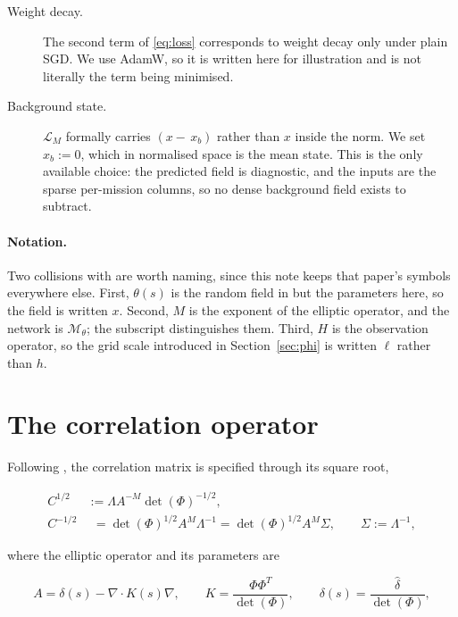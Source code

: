 \documentclass[11pt]{article}
\newcommand{\Mnet}{\mathcal{M}_\theta}
\newcommand{\grid}{\ell}
\newcommand{\dhat}{\hat{\delta}}
\begin{document}
\begin{description}
  \item[Weight decay.] The second term of \eqref{eq:loss} corresponds to weight decay
  only under plain SGD. We use AdamW, so it is written here for illustration and is not
  literally the term being minimised.

  \item[Background state.] $\mathcal{L}_M$ formally carries $(x-\,x_b)$ rather
      than $x$ inside the norm. We
  set $x_b := 0$, which in normalised space is the mean state. This is the only available
  choice: the predicted field is diagnostic, and the inputs are the sparse per-mission
  columns, so no dense background field exists to subtract.
\end{description}

\paragraph{Notation.} Two collisions with \citet{smith2022} are worth naming, since this
note keeps that paper's symbols everywhere else. First, $\theta(s)$ is the random field
in \citet{smith2022} but the parameters here, so the field is written $x$. Second, $M$ is
the exponent of the elliptic operator, and the network is $\Mnet$; the subscript
distinguishes them. Third, $H$ is the observation operator, so the grid scale introduced
in Section~\ref{sec:phi} is written $\grid$ rather than $h$.

\section{The correlation operator}

Following \citet{smith2022}, the correlation matrix is specified through its square root,

\begin{align}
C^{1/2}  &:= \Lambda A^{-M}\det(\Phi)^{-1/2}, \label{eq:chalf}\\
C^{-1/2} &\phantom{:}= \det(\Phi)^{1/2} A^{M} \Lambda^{-1}
                     = \det(\Phi)^{1/2} A^{M} \Sigma,
\qquad \Sigma := \Lambda^{-1}, \label{eq:cinvhalf}
\end{align}

\noindent where the elliptic operator and its parameters are

\begin{equation}
\label{eq:A}
A = \delta(s) - \nabla\cdot K(s) \nabla,
\qquad
K = \frac{\Phi\Phi^{T}}{\det(\Phi)},
\qquad
\delta(s) = \frac{\dhat}{\det(\Phi)},
\end{equation}
\end{document}
